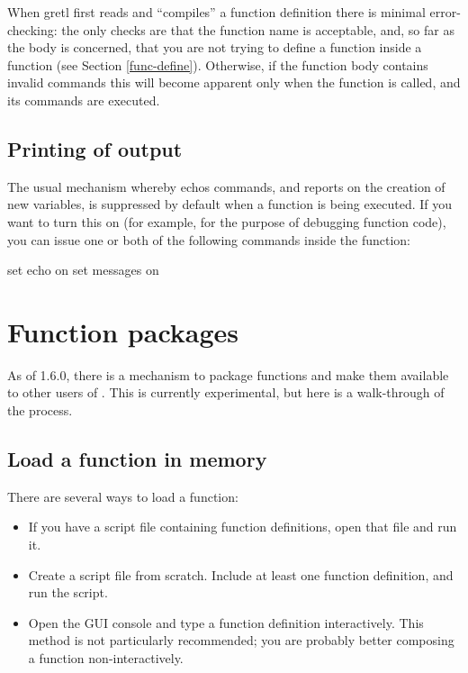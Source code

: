 When gretl first reads and ``compiles'' a function definition there is
minimal error-checking: the only checks are that the function name is
acceptable, and, so far as the body is concerned, that you are not
trying to define a function inside a function (see Section
\ref{func-define}). Otherwise, if the function body contains invalid
commands this will become apparent only when the function is called,
and its commands are executed.


\subsection{Printing of output}

The usual mechanism whereby  echos commands, and reports on
the creation of new variables, is suppressed by default when a
function is being executed.  If you want to turn this on (for example,
for the purpose of debugging function code), you can issue one or both
of the following commands inside the function:
%
\begin{code}
set echo on
set messages on
\end{code}

\section{Function packages}
\label{sec:func-packages}

As of  1.6.0, there is a mechanism to package functions and
make them available to other users of .  This is currently
experimental, but here is a walk-through of the process.

\subsection{Load a function in memory}

There are several ways to load a function:

\begin{itemize}
\item If you have a script file containing function definitions, open
  that file and run it.
\item Create a script file from scratch.  Include at least one
  function definition, and run the script.
\item Open the GUI console and type a function definition
  interactively.  This method is not particularly recommended; you are
  probably better composing a function non-interactively.
\end{itemize}

